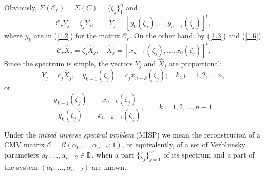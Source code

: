 \documentclass{amsart}
\begin{document}
Obviously, ${\Sigma}({{\mathcal C}}_r)={\Sigma}(C)=\{{\zeta}_j\}_1^n$ and
$$ {{\mathcal C}}_r Y_{j} = {\zeta}_j Y_{j}, \qquad Y_{j} =
[y_{0}({\zeta}_j),\ldots, y_{n-1}({\zeta}_j)]^t,
$$
where $y_{k}$ are in (\ref{1.2}) for the matrix ${{\mathcal C}}_r$. On the
other hand, by (\ref{1.3}) and (\ref{1.6})
$$ {{\mathcal C}}_r\hat X_j = {\zeta}_j \hat X_j, \quad \hat X_j =
[x_{n-1}({\zeta}_j),\ldots,x_0({\zeta}_j)]^t.
$$
Since the spectrum is simple, the vectors $Y_{j}$ and $\hat X_j$ are
proportional:
$$ Y_{j} = c_j \hat X_j, \quad y_{k-1}({\zeta}_j)=c_j x_{n-k}({\zeta}_j);
\quad k,j = 1,2,\ldots,n,
$$
or
\begin{equation} \label{1.8}
\frac{y_{k-1}({\zeta}_j)}{y_{k}({\zeta}_j)} =
\frac{x_{n-k}({\zeta}_j)}{x_{n-k-1}({\zeta}_j)}, \qquad k=1,2,\ldots,n-1.
\end{equation}

\bigskip

Under the {\it mixed inverse spectral problem} (MISP) we mean the
reconstrucion of a CMV matrix ${{\mathcal C}}={{\mathcal C}}({\alpha}_0,\ldots,{\alpha}_{n-2};1)$, or
equivalently, of a set of Verblunsky parameters
${\alpha}_0,\ldots,{\alpha}_{n-2} \in {{\mathbb D}}$, when a part $\{{\zeta}_j\}_{j=1}^m$ of
its spectrum and a part of the system $({\alpha}_0,\ldots,{\alpha}_{n-2})$ are
known.
\end{document}
